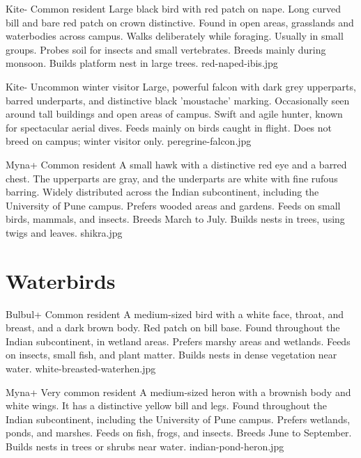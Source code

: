 \documentclass[aspectratio=169]{beamer}
\begin{document}
{Kite-}
{Common resident}
{Large black bird with red patch on nape. Long curved bill and bare red patch on crown distinctive.}
{Found in open areas, grasslands and waterbodies across campus.}
{Walks deliberately while foraging. Usually in small groups. Probes soil for insects and small vertebrates.}
{Breeds mainly during monsoon. Builds platform nest in large trees.}
{red-naped-ibis.jpg}

{Kite-}
{Uncommon winter visitor}
{Large, powerful falcon with dark grey upperparts, barred underparts, and distinctive black 'moustache' marking.}
{Occasionally seen around tall buildings and open areas of campus.}
{Swift and agile hunter, known for spectacular aerial dives. Feeds mainly on birds caught in flight.}
{Does not breed on campus; winter visitor only.}
{peregrine-falcon.jpg}

{Myna+}
{Common resident}
{A small hawk with a distinctive red eye and a barred chest. The upperparts are gray, and the underparts are white with fine rufous barring.}
{Widely distributed across the Indian subcontinent, including the University of Pune campus.}
{Prefers wooded areas and gardens. Feeds on small birds, mammals, and insects.}
{Breeds March to July. Builds nests in trees, using twigs and leaves.}
{shikra.jpg}

\section{Waterbirds}
{Bulbul+}
{Common resident}
{A medium-sized bird with a white face, throat, and breast, and a dark brown body. Red patch on bill base.}
{Found throughout the Indian subcontinent, in wetland areas.}
{Prefers marshy areas and wetlands. Feeds on insects, small fish, and plant matter.}
{Builds nests in dense vegetation near water.}
{white-breasted-waterhen.jpg}

{Myna+}
{Very common resident}
{A medium-sized heron with a brownish body and white wings. It has a distinctive yellow bill and legs.}
{Found throughout the Indian subcontinent, including the University of Pune campus.}
{Prefers wetlands, ponds, and marshes. Feeds on fish, frogs, and insects.}
{Breeds June to September. Builds nests in trees or shrubs near water.}
{indian-pond-heron.jpg}
\end{document}
